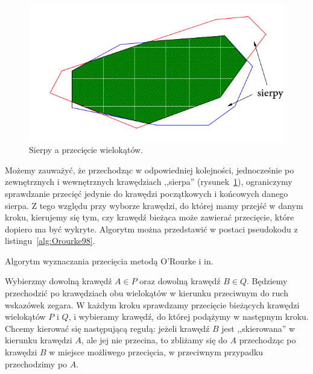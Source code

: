 \begin{figure}[htb]
  \centering
  \includegraphics[scale=0.5]{img/Orourke98}
  \caption{Sierpy a przecięcie wielokątów.\label{img:sickles}}
\end{figure}

Możemy zauważyć, że przechodząc w odpowiedniej kolejności,
jednocześnie po zewnętrznych i wewnętrznych krawędziach ,,sierpa''
(rysunek~\ref{img:sickles}), ograniczymy sprawdzanie przecięć jedynie
do krawędzi początkowych i końcowych danego sierpa. Z tego względu
przy wyborze krawędzi, do której mamy przejść w danym kroku, kierujemy
się tym, czy krawędź bieżąca może zawierać przecięcie, które dopiero
ma być wykryte. Algorytm można przedstawić w postaci pseudokodu z
listingu~\ref{alg:Orourke98}.

\begin{algorithm}
  \caption{Algorytm wyznaczania przecięcia metodą O'Rourke i
    in.\label{alg:Orourke98}}
  \begin{algorithmic}[1]


    \Repeat

    \EndProcedure
  \end{algorithmic}
\end{algorithm}

Wybierzmy dowolną krawędź $A \in P$ oraz dowolną krawędź $B \in
Q$. Będziemy przechodzić po krawędziach obu wielokątów w kierunku
przeciwnym do ruch wskazówek zegara. W każdym kroku sprawdzamy
przecięcie bieżących krawędzi wielokątów $P$ i $Q$, i wybieramy
krawędź, do której podążymy w następnym kroku.  Chcemy kierować się
następującą regułą: jeżeli krawędź $B$ jest ,,skierowana'' w kierunku
krawędzi $A$, ale jej nie przecina, to zbliżamy się do $A$ przechodząc
po krawędzi $B$ w miejsce możliwego przecięcia, w przeciwnym przypadku
przechodzimy po $A$.

